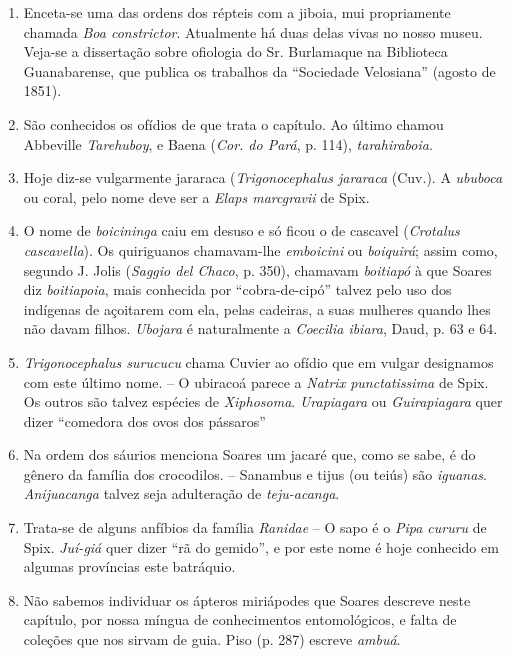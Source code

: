 \begin{enumerate}
\item Enceta-se uma das ordens dos répteis com a jiboia, mui propriamente chamada  \textit{Boa constrictor}. 
Atualmente há duas delas vivas no nosso museu. Veja-se a dissertação 
sobre ofiologia do Sr. Burlamaque na Biblioteca Guanabarense, que publica os 
trabalhos da ``Sociedade Velosiana'' (agosto de 1851).

\item São conhecidos os ofídios de que trata o capítulo. Ao último chamou Abbeville  
\textit{Tarehuboy}, e Baena (\textit{Cor. do Pará}, p. 114), \textit{tarahiraboia}.

\item Hoje diz-se vulgarmente jararaca (\textit{Trigonocephalus jararaca} (Cuv.). A \textit{ububoca} 
ou coral, pelo nome deve ser a \textit{Elaps marcgravii} de Spix.

\item O nome de \textit{boicininga} caiu em desuso e só ficou o de cascavel (\textit{Crotalus cascavella}). 
Os quiriguanos chamavam-lhe \textit{emboicini} ou \textit{boiquirá}; assim como, 
segundo J. Jolis (\textit{Saggio del Chaco}, p. 350), chamavam \textit{boitiapó} à que Soares diz 
\textit{boitiapoia}, mais conhecida por ``cobra-de-cipó''  talvez pelo uso dos indígenas de 
açoitarem com ela, pelas cadeiras, a suas mulheres quando lhes não davam filhos.
\textit{Ubojara} é naturalmente a \textit{Coecilia ibiara}, Daud, p. 63 e 64.

\item \textit{Trigonocephalus surucucu} chama Cuvier ao ofídio que em vulgar designamos 
com este último nome. -- O ubiracoá parece a \textit{Natrix punctatissima} de Spix. Os outros 
são talvez espécies de \textit{Xiphosoma}. \textit{Urapiagara} ou \textit{Guirapiagara} quer dizer ``comedora 
dos ovos dos pássaros'' 

\item Na ordem dos sáurios menciona Soares um jacaré que, como se sabe, é do gênero 
da família dos crocodilos. -- Sanambus e tijus (ou teiús) são \textit{iguanas}. \textit{Anijuacanga} 
talvez seja adulteração de \textit{teju-acanga}.

\item Trata-se de alguns anfíbios da família \textit{Ranidae} -- O sapo é o \textit{Pipa cururu} de Spix.  
\textit{Juí-giá} quer dizer ``rã do gemido'', e por este nome é hoje conhecido em algumas 
províncias este batráquio.

\item Não sabemos individuar os ápteros miriápodes que Soares descreve neste 
capítulo, por nossa míngua de conhecimentos entomológicos, e falta de coleções que 
nos sirvam de guia. Piso (p. 287) escreve \textit{ambuá}.


\end{enumerate}
